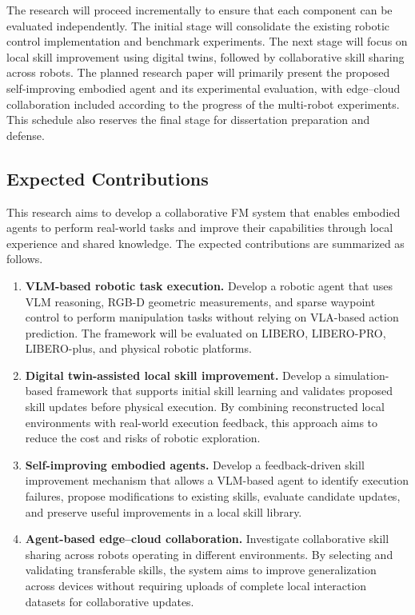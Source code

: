 \documentclass[11pt]{article}
\begin{document}
The research will proceed incrementally to ensure that each component can be evaluated independently. The initial stage will consolidate the existing robotic control implementation and benchmark experiments. The next stage will focus on local skill improvement using digital twins, followed by collaborative skill sharing across robots. The planned research paper will primarily present the proposed self-improving embodied agent and its experimental evaluation, with edge--cloud collaboration included according to the progress of the multi-robot experiments. This schedule also reserves the final stage for dissertation preparation and defense.

\subsection{Expected Contributions}
\label{subsec:contributions}

This research aims to develop a collaborative FM system that enables embodied agents to perform real-world tasks and improve their capabilities through local experience and shared knowledge. The expected contributions are summarized as follows.

\begin{enumerate}
    \item \textbf{VLM-based robotic task execution.} Develop a robotic agent that uses VLM reasoning, RGB-D geometric measurements, and sparse waypoint control to perform manipulation tasks without relying on VLA-based action prediction. The framework will be evaluated on LIBERO, LIBERO-PRO, LIBERO-plus, and physical robotic platforms.

    \item \textbf{Digital twin-assisted local skill improvement.} Develop a simulation-based framework that supports initial skill learning and validates proposed skill updates before physical execution. By combining reconstructed local environments with real-world execution feedback, this approach aims to reduce the cost and risks of robotic exploration.

    \item \textbf{Self-improving embodied agents.} Develop a feedback-driven skill improvement mechanism that allows a VLM-based agent to identify execution failures, propose modifications to existing skills, evaluate candidate updates, and preserve useful improvements in a local skill library.

    \item \textbf{Agent-based edge--cloud collaboration.} Investigate collaborative skill sharing across robots operating in different environments. By selecting and validating transferable skills, the system aims to improve generalization across devices without requiring uploads of complete local interaction datasets for collaborative updates.
\end{enumerate}
\end{document}
